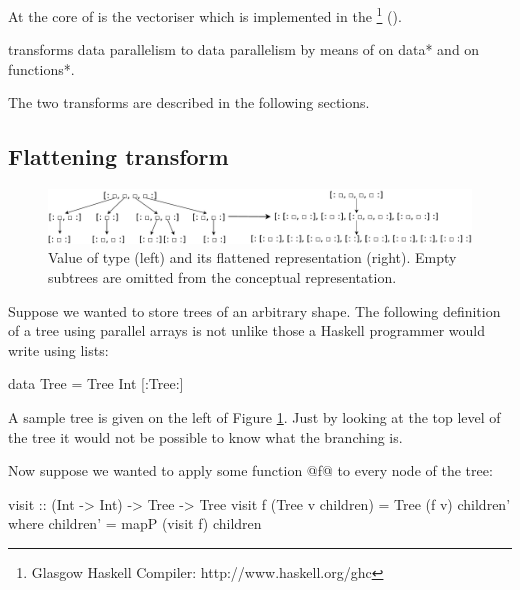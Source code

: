 \documentclass[preamble.tex]{subfiles}
\begin{document}
At the core of \DPH is the vectoriser which is implemented in the \footnote{Glasgow Haskell Compiler: http://www.haskell.org/ghc} (\GHC).

\begin{bluebox}
 transforms  data parallelism to  data parallelism by means of  on \*data* and  on \*functions*.
\end{bluebox}

The two transforms are described in the following sections.



\subsection{Flattening transform}
\label{sec:Flattening}


\begin{figure}
\includegraphics[width=1\textwidth]{img/TreeRepr}
\caption{Value of type \code{[:Tree:]} (left) and its flattened representation (right). Empty subtrees are omitted from the conceptual representation.%
\label{fig:TreeRepr}}
\end{figure}


Suppose we wanted to store trees of an arbitrary shape. The following definition of a tree using parallel arrays is not unlike those a Haskell programmer would write using lists:

\begin{hscode}
data Tree = Tree Int [:Tree:]
\end{hscode}

A sample tree is given on the left of Figure \ref{fig:TreeRepr}. Just by looking at the top level of the tree it would not be possible to know what the branching is.

Now suppose we wanted to apply some function @f@ to every node of the tree:


\begin{hscode}
visit :: (Int -> Int) -> Tree -> Tree
visit f (Tree v children) = Tree (f v) children'
  where children' = mapP (visit f) children
\end{hscode}
\end{document}
